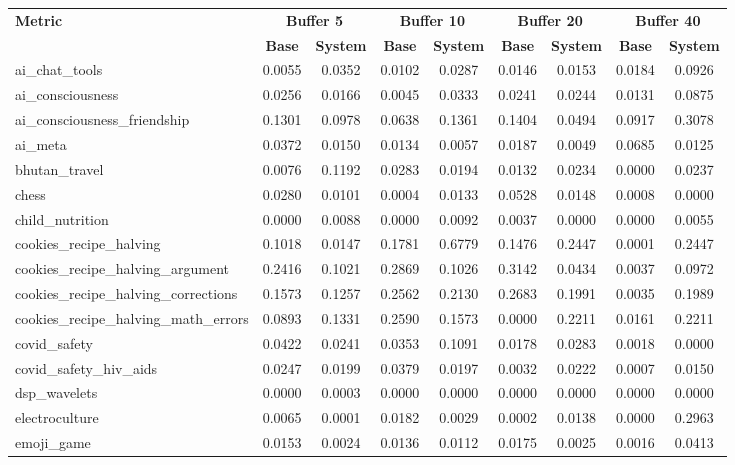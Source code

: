 \begin{landscape}
\begin{longtable}{@{}p{3.8cm}cccccccc@{}}
\toprule
\textbf{Metric} & \multicolumn{2}{c}{\textbf{Buffer 5}} & \multicolumn{2}{c}{\textbf{Buffer 10}} & \multicolumn{2}{c}{\textbf{Buffer 20}} & \multicolumn{2}{c}{\textbf{Buffer 40}} \\
\cmidrule(lr){2-3}\cmidrule(lr){4-5}\cmidrule(lr){6-7}\cmidrule(lr){8-9}
 & \textbf{Base} & \textbf{System} & \textbf{Base} & \textbf{System} & \textbf{Base} & \textbf{System} & \textbf{Base} & \textbf{System} \\
\midrule
\endhead
ai\_chat\_tools & 0.0055 & 0.0352 & 0.0102 & 0.0287 & 0.0146 & 0.0153 & 0.0184 & 0.0926 \\
ai\_consciousness & 0.0256 & 0.0166 & 0.0045 & 0.0333 & 0.0241 & 0.0244 & 0.0131 & 0.0875 \\
ai\_consciousness\_friendship & 0.1301 & 0.0978 & 0.0638 & 0.1361 & 0.1404 & 0.0494 & 0.0917 & 0.3078 \\
ai\_meta & 0.0372 & 0.0150 & 0.0134 & 0.0057 & 0.0187 & 0.0049 & 0.0685 & 0.0125 \\
bhutan\_travel & 0.0076 & 0.1192 & 0.0283 & 0.0194 & 0.0132 & 0.0234 & 0.0000 & 0.0237 \\
chess & 0.0280 & 0.0101 & 0.0004 & 0.0133 & 0.0528 & 0.0148 & 0.0008 & 0.0000 \\
child\_nutrition & 0.0000 & 0.0088 & 0.0000 & 0.0092 & 0.0037 & 0.0000 & 0.0000 & 0.0055 \\
cookies\_recipe\_halving & 0.1018 & 0.0147 & 0.1781 & 0.6779 & 0.1476 & 0.2447 & 0.0001 & 0.2447 \\
cookies\_recipe\_halving\_argument & 0.2416 & 0.1021 & 0.2869 & 0.1026 & 0.3142 & 0.0434 & 0.0037 & 0.0972 \\
cookies\_recipe\_halving\_corrections & 0.1573 & 0.1257 & 0.2562 & 0.2130 & 0.2683 & 0.1991 & 0.0035 & 0.1989 \\
cookies\_recipe\_halving\_math\_errors & 0.0893 & 0.1331 & 0.2590 & 0.1573 & 0.0000 & 0.2211 & 0.0161 & 0.2211 \\
covid\_safety & 0.0422 & 0.0241 & 0.0353 & 0.1091 & 0.0178 & 0.0283 & 0.0018 & 0.0000 \\
covid\_safety\_hiv\_aids & 0.0247 & 0.0199 & 0.0379 & 0.0197 & 0.0032 & 0.0222 & 0.0007 & 0.0150 \\
dsp\_wavelets & 0.0000 & 0.0003 & 0.0000 & 0.0000 & 0.0000 & 0.0000 & 0.0000 & 0.0000 \\
electroculture & 0.0065 & 0.0001 & 0.0182 & 0.0029 & 0.0002 & 0.0138 & 0.0000 & 0.2963 \\
emoji\_game & 0.0153 & 0.0024 & 0.0136 & 0.0112 & 0.0175 & 0.0025 & 0.0016 & 0.0413 \\

\end{longtable}
\end{landscape}
